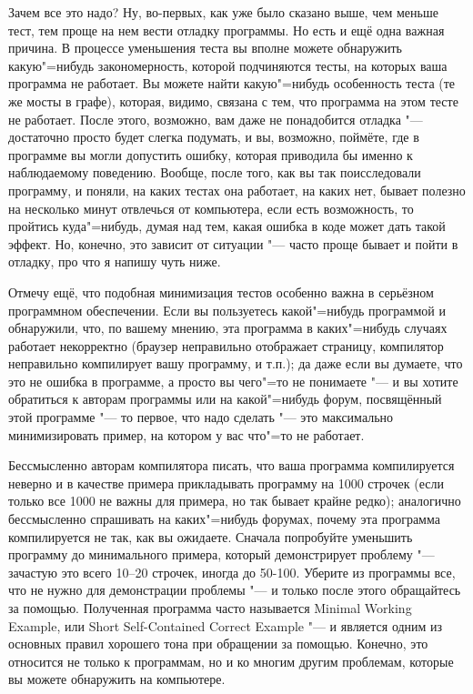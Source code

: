 Зачем все это надо?
Ну, во-первых, как уже было сказано выше, чем меньше тест, тем проще на нем вести отладку программы.
Но есть и ещё одна важная причина. 
В процессе уменьшения теста вы вполне можете обнаружить какую"=нибудь закономерность, которой подчиняются тесты, на которых ваша программа не работает.
Вы можете найти какую"=нибудь особенность теста (те же мосты в графе), которая, видимо, связана с тем, что программа на этом тесте не работает.
После этого, возможно, вам даже не понадобится отладка "--- достаточно просто будет слегка подумать, и вы, возможно, поймёте, где в программе
вы могли допустить ошибку, которая приводила бы именно к наблюдаемому поведению.
Вообще, после того, как вы так поисследовали программу, и поняли, на каких тестах она работает, на каких нет, бывает полезно на несколько минут отвлечься
от компьютера, если есть возможность, то пройтись куда"=нибудь, думая над тем, какая ошибка в коде может дать такой эффект. 
Но, конечно, это зависит от ситуации "--- часто проще бывает и пойти в отладку, про что я напишу чуть ниже.

Отмечу ещё, что подобная минимизация тестов особенно важна в серьёзном программном обеспечении. 
Если вы пользуетесь какой"=нибудь программой и обнаружили, что, по вашему мнению, эта программа в каких"=нибудь случаях работает некорректно
(браузер неправильно отображает страницу, компилятор неправильно компилирует вашу программу, и т.п.); да даже если вы думаете, что это не ошибка в программе,
а просто вы чего"=то не понимаете "--- и вы хотите обратиться к авторам программы или на какой"=нибудь форум, посвящённый этой программе "--- 
то первое, что надо сделать "--- это максимально минимизировать пример, на котором у вас что"=то не работает.

Бессмысленно авторам компилятора писать, что ваша программа компилируется неверно и в качестве примера прикладывать программу на 1000 строчек 
(если только все 1000 не важны для примера, но так бывает крайне редко); 
аналогично бессмысленно спрашивать на каких"=нибудь форумах, почему эта программа компилируется не так, как вы ожидаете. 
Сначала попробуйте уменьшить программу до минимального примера, который демонстрирует проблему "--- зачастую это всего 10--20 строчек, иногда
до 50-100. 
Уберите из программы все, что не нужно для демонстрации проблемы "--- и только после этого обращайтесь за помощью. 
Полученная программа часто называется Minimal Working Example, или Short Self-Contained Correct Example "--- и является одним из
основных правил хорошего тона при обращении за помощью.
Конечно, это относится не только к программам, но и ко многим другим проблемам, которые вы можете обнаружить на компьютере.

